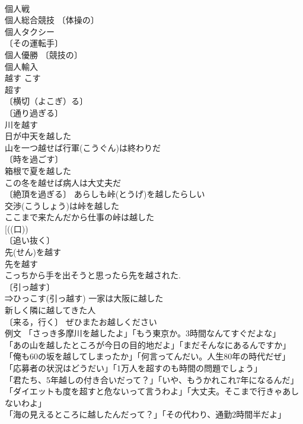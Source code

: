 \documentclass[8pt]{extreport}
\begin{document}
\begin{CJK}{UTF8}{min}
\\	個人戦 
\\	個人総合競技 〔体操の〕
\\	個人タクシー 
\\	〔その運転手〕
\\	個人優勝 〔競技の〕
\\	個人輸入 
\\	越す	こす	
\\	超す 
\\	〔横切（よこぎ）る〕
\\	〔通り過ぎる〕
\\	川を越す 
\\	日が中天を越した 
\\	山を一つ越せば行軍(こうぐん)は終わりだ 
\\	〔時を過ごす〕
\\	箱根で夏を越した 
\\	この冬を越せば病人は大丈夫だ 
\\	〔絶頂を過ぎる〕 あらしも峠(とうげ)を越したらしい 
\\	交渉(こうしょう)は峠を越した 
\\	ここまで来たんだから仕事の峠は越した 
\\	[((口))
\\	〔追い抜く〕
\\	先(せん)を越す 
\\	先を越す 
\\	こっちから手を出そうと思ったら先を越された. 
\\	〔引っ越す〕
\\	⇒ひっこす(引っ越す) 一家は大阪に越した 
\\	新しく隣に越してきた人 
\\	〔来る，行く〕 ぜひまたお越しください 
\\	例文 「さっき多摩川を越したよ」「もう東京か。3時間なんてすぐだよな」 
\\	「あの山を越したところが今日の目的地だよ」「まだそんなにあるんですか」 
\\	「俺も60の坂を越してしまったか」「何言ってんだい。人生80年の時代だぜ」 
\\	「応募者の状況はどうだい」「1万人を超すのも時間の問題でしょう」 
\\	「君たち、5年越しの付き合いだって？」「いや、もうかれこれ7年になるんだ」 
\\	「ダイエットも度を超すと危ないって言うわよ」「大丈夫。そこまで行きゃあしないわよ」 
\\	「海の見えるところに越したんだって？」「その代わり、通勤2時間半だよ」 

\end{CJK}
\end{document}
